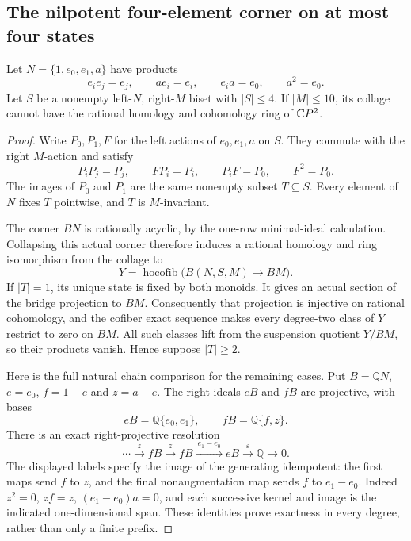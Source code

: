 \subsection{The nilpotent four-element corner on at most four states}

\begin{proposition}
\label{CP2:A-nilpotent-four-corner-four-states}
Let $N=\{1,e_0,e_1,a\}$ have products
\[
 e_i e_j=e_j,\qquad ae_i=e_i,\qquad e_i a=e_0,
 \qquad a^2=e_0.
\]
Let $S$ be a nonempty left-$N$, right-$M$ biset with $|S|\leq4$.
If $|M|\leq10$, its collage cannot have the rational homology and
cohomology ring of $\mathbb{C}P^2$.
\end{proposition}
\begin{proof}
Write $P_0,P_1,F$ for the left actions of $e_0,e_1,a$ on $S$.
They commute with the right $M$-action and satisfy
\[
 P_iP_j=P_j,\qquad FP_i=P_i,\qquad P_iF=P_0,
 \qquad F^2=P_0.
\]
The images of $P_0$ and $P_1$ are the same nonempty subset
$T\subseteq S$.  Every element of $N$ fixes $T$ pointwise, and $T$
is $M$-invariant.

The corner $BN$ is rationally acyclic, by the one-row minimal-ideal
calculation.  Collapsing this actual corner therefore induces a
rational homology and ring isomorphism from the collage to
\[
 Y=\operatorname{hocofib}\bigl(B(N,S,M)\longrightarrow BM\bigr).
\]
If $|T|=1$, its unique state is fixed by both monoids.  It gives an
actual section of the bridge projection to $BM$.  Consequently that
projection is injective on rational cohomology, and the cofiber exact
sequence makes every degree-two class of $Y$ restrict to zero on
$BM$.  All such classes lift from the suspension quotient $Y/BM$,
so their products vanish.  Hence suppose $|T|\geq2$.

Here is the full natural chain comparison for the remaining cases.
Put $B=\mathbb QN$, $e=e_0$, $f=1-e$ and $z=a-e$.
The right ideals $eB$ and $fB$ are projective, with bases
\[
 eB=\mathbb Q\{e_0,e_1\},\qquad
 fB=\mathbb Q\{f,z\}.
\]
There is an exact right-projective resolution
\[
 \cdots\xrightarrow{\ z\ }fB
 \xrightarrow{\ z\ }fB
 \xrightarrow{\ e_1-e_0\ }eB
 \xrightarrow{\ \varepsilon\ }\mathbb Q\longrightarrow0.
\]
The displayed labels specify the image of the generating idempotent:
the first maps send $f$ to $z$, and the final nonaugmentation map
sends $f$ to $e_1-e_0$.  Indeed $z^2=0$, $zf=z$,
$(e_1-e_0)a=0$, and each successive kernel and image is the indicated
one-dimensional span.  These identities prove exactness in every
degree, rather than only a finite prefix.


\end{proof}
